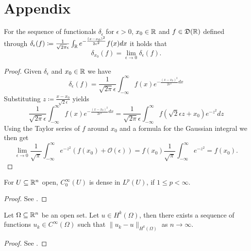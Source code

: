 \chapter*{Appendix}  

\begin{atheorem} \label{athem:delta}
	For the sequence of functionals $\delta_{\epsilon}$ for $\epsilon > 0$, $x_{0} \in \mathbb{R}$ and $f \in \mathfrak{D}(\mathbb{R})$ defined through $\delta_{\epsilon}(f) \coloneqq \frac{1}{\sqrt{2 \pi} \epsilon} \int_{\mathbb{R}} e^{-\frac{(x - x_{0})^{2}}{2 \epsilon^{2}}} f(x) dx$ it holds that  
 		\[ \delta_{x_{0}}(f) = \lim_{\epsilon \rightarrow 0} \delta_{\epsilon}(f). \]
	
	\begin{proof}
		Given $\delta_{\epsilon}$ and $x_{0} \in \mathbb{R}$ we have
			\[ \delta_{\epsilon}(f) = \frac{1}{\sqrt{2 \pi} \epsilon} \int_{-\infty}^{\infty} f(x) e^{-\frac{(x-x_{0})^{2}}{2 \epsilon^{2}} dx} \]
		Substituting $z \coloneqq \frac{x - x_{0}}{\sqrt{2} \epsilon}$ yields
			\[ \frac{1}{\sqrt{2 \pi} \epsilon} \int_{-\infty}^{\infty} f(x) e^{-\frac{(x-x_{0})^{2}}{2 \epsilon^{2}} dx} = \frac{1}{\sqrt{2 \pi} \epsilon} \int_{-\infty}^{\infty} f(\sqrt{2} \epsilon z + x_{0}) e^{-z^{2}} dz \]
		Using the Taylor series of $f$ around $x_{0}$ and a formula for the Gaussian integral we then get
			\[ \lim_{\epsilon \rightarrow 0} \frac{1}{\sqrt{\pi}} \int_{-\infty}^{\infty} e^{-z^{2}} \left( f(x_{0}) + \mathcal{O}(\epsilon) \right) = f(x_{0}) \frac{1}{\sqrt{\pi}} \int_{-\infty}^{\infty} e^{-z^{2}} = f(x_{0}). \]
	\end{proof}
\end{atheorem}

\begin{atheorem} \label{athm:approx}
	For $U \subseteq \mathbb{R}^{n}$ open, $C_{0}^{\infty}(U)$ is dense in $L^{p}(U)$, if $1 \leq p < \infty$.
	
	\begin{proof}
		See \cite[p. 31]{adams2003sobolev}.
	\end{proof}
\end{atheorem}

\begin{atheorem} 
	Let $\Omega \subseteq \mathbb{R}^{n}$ be an open set. Let $u \in H^{k}(\Omega)$, then there exists a sequence of functions $u_{k} \in C^{\infty}(\Omega)$ such that $\| u_{k} - u \|_{H^{k}(\Omega)}$ as $n \rightarrow \infty$.
	
	\begin{proof}
		See \cite[p. 138]{adams2003sobolev}.
	\end{proof}	
\end{atheorem}


